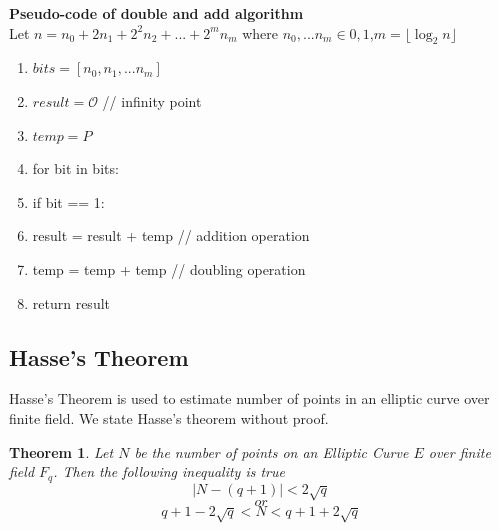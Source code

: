 \documentclass[a4paper,12pt]{report}
\newtheorem{theorem}{Theorem}
\begin{document}
\cleardoublepage
\textbf{Pseudo-code of double and add algorithm}\\
Let $n=n_0+2n_1+2^2n_2+...+2^mn_m$ where $n_0,...n_m \in {0,1}$,$m =\lfloor \log_2 {n} \rfloor$
\begin{enumerate}
	\item $bits = [n_0,n_1,...n_m]$
	\item $result=\mathscr{O}$ \hspace{10mm} //  infinity point
	\item $temp=P$
	\item for bit in bits:
	\item \hspace{10mm}  if bit == 1:
	\item \hspace{10mm} \hspace{10mm}  result = result + temp \hspace{10mm} // addition operation
	\item \hspace{10mm} temp = temp + temp \hspace{10mm}  // doubling operation
	\item return result
\end{enumerate}
\subsection{Hasse's Theorem}
Hasse's Theorem is used to estimate number of points in an elliptic curve over finite field. We state Hasse's theorem without proof.
\begin{theorem}
Let $N$ be the number of points on an Elliptic Curve $E$ over finite field $F_q$. Then the following inequality is true
$$|N-(q+1)|<2\sqrt{q}$$ 
$$or$$
$$q+1-2\sqrt{q}<N<q+1+2\sqrt{q}$$
\end{theorem}
\end{document}
